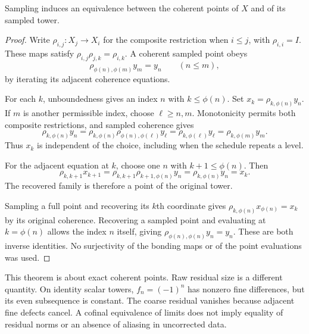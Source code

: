\begin{theorem}\label{KS18}
Sampling induces an equivalence between the coherent points of \(X\) and of its sampled tower.
\end{theorem}
\begin{proof}
Write $\rho_{i,j}:X_j\to X_i$ for the composite restriction when $i\le j$, with $\rho_{i,i}=I$. These maps satisfy $\rho_{i,j}\rho_{j,k}=\rho_{i,k}$. A coherent sampled point obeys
\[
 \rho_{\phi(n),\phi(m)}y_m=y_n\qquad(n\le m),
\]
by iterating its adjacent coherence equations.

For each $k$, unboundedness gives an index $n$ with $k\le\phi(n)$. Set $x_k=\rho_{k,\phi(n)}y_n$. If $m$ is another permissible index, choose $\ell\ge n,m$. Monotonicity permits both composite restrictions, and sampled coherence gives
\[
 \rho_{k,\phi(n)}y_n
 =\rho_{k,\phi(n)}\rho_{\phi(n),\phi(\ell)}y_\ell
 =\rho_{k,\phi(\ell)}y_\ell
 =\rho_{k,\phi(m)}y_m.
\]
Thus $x_k$ is independent of the choice, including when the schedule repeats a level.

For the adjacent equation at $k$, choose one $n$ with $k+1\le\phi(n)$. Then
\[
 \rho_{k,k+1}x_{k+1}
 =\rho_{k,k+1}\rho_{k+1,\phi(n)}y_n
 =\rho_{k,\phi(n)}y_n=x_k.
\]
The recovered family is therefore a point of the original tower.

Sampling a full point and recovering its $k$th coordinate gives $\rho_{k,\phi(n)}x_{\phi(n)}=x_k$ by its original coherence. Recovering a sampled point and evaluating at $k=\phi(n)$ allows the index $n$ itself, giving $\rho_{\phi(n),\phi(n)}y_n=y_n$. These are both inverse identities. No surjectivity of the bonding maps or of the point evaluations was used.
\end{proof}
This theorem is about exact coherent points. Raw residual size is a different quantity. On identity scalar towers, \(f_n=(-1)^n\) has nonzero fine differences, but its even subsequence is constant. The coarse residual vanishes because adjacent fine defects cancel. A cofinal equivalence of limits does not imply equality of residual norms or an absence of aliasing in uncorrected data.




